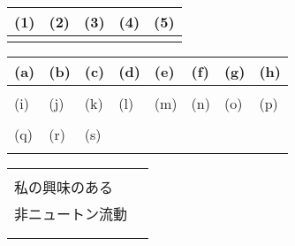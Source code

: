 

\begin{table}[htb]
    \begin{center} 
      \begin{tabular}{|p{}|p{}|p{}|p{}|p{}|} \hline
        (1) & (2) & (3) & (4) & (5)\\ \hline \hline
          &  & & &  \\ \hline		
      \end{tabular}
    \end{center}
  \end{table}

  \begin{table}[htb]
    \begin{center} 
      \begin{tabular}{|p{}|p{}|p{}|p{}|p{}|p{}|p{}|p{}|} \hline
        (a) & (b) & (c) & (d) & (e) & (f) & (g) & (h)\\ \hline
          &  & & & & & &\\ \hline		
        (i) & (j) & (k) & (l) & (m) & (n) & (o) & (p)\\ \hline
        &  & & & & & &\\ \hline		
        (q) & (r) & (s) \\ \cline{1-3}
        &  & \\ \cline{1-3}
    \end{tabular}
    \end{center}
  \end{table}

\begin{table}[htb]
  \begin{center} 
    \begin{tabular}{|l|p{}|} \hline
      & \\
      私の興味のある  & \\
      非ニュートン流動 & \\ 
            & \\ 
      & \\ \hline
    \end{tabular}
  \end{center}
\end{table}

